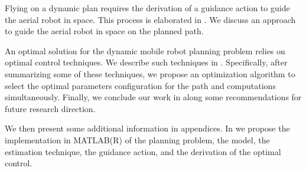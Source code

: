 Flying on a dynamic plan requires the derivation of a guidance action to guide the aerial robot in space. This process is elaborated in . We discuss an approach to guide the aerial robot in space on the planned path. 

An optimal solution for the dynamic mobile robot planning problem relies on optimal control techniques. We describe such techniques in . Specifically, after summarizing some of these techniques, we propose an optimization algorithm to select the optimal parameters configuration for the path and computations simultaneously. Finally, we conclude our work in  along some recommendations for future research direction. 

We then present some additional information in appendices. In  we propose the implementation in MATLAB(R) of the planning problem, the model, the estimation technique, the guidance action, and the derivation of the optimal control. 

